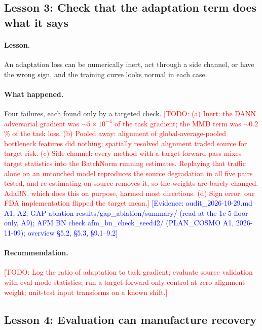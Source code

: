 \documentclass{ametsocV6.2}
\newcommand{\todo}[1]{\textcolor{red}{[TODO: #1]}}
\newcommand{\ev}[1]{\textcolor{blue}{[Evidence: #1]}}
\begin{document}
\subsection{Lesson 3: Check that the adaptation term does what it says}
\label{sec:L3}

\paragraph{Lesson.} An adaptation loss can be numerically inert, act
through a side channel, or have the wrong sign, and the training curve
looks normal in each case.

\paragraph{What happened.} Four failures, each found only by a targeted
check. \todo{(a) Inert: the DANN adversarial gradient was
$\sim 5\times10^{-4}$ of the task gradient; the MMD term was
$\sim$0.2\,\% of the task loss. (b) Pooled away: alignment of
global-average-pooled bottleneck features did nothing; spatially resolved
alignment traded source for target risk. (c) Side channel: every method
with a target forward pass mixes target statistics into the BatchNorm
running estimates. Replaying that traffic alone on an untouched model
reproduces the source degradation in all five pairs tested, and
re-estimating on source removes it, so the weights are barely changed.
AdaBN, which does this on purpose, harmed most directions. (d) Sign
error: our FDA implementation flipped the target mean.}
\ev{audit\_2026-10-29.md A1, A2; GAP ablation results/gap\_ablation/summary/
(read at the 1e-5 floor only, A9); AFM BN check afm\_bn\_check\_seed42/
(PLAN\_COSMO A1, 2026-11-09); overview \S5.2, \S5.3, \S9.1--9.2}

\paragraph{Recommendation.} \todo{Log the ratio of adaptation to task
gradient; evaluate source validation with eval-mode statistics; run a
target-forward-only control at zero alignment weight; unit-test input
transforms on a known shift.}

\subsection{Lesson 4: Evaluation can manufacture recovery}\label{sec:L4}
\end{document}
